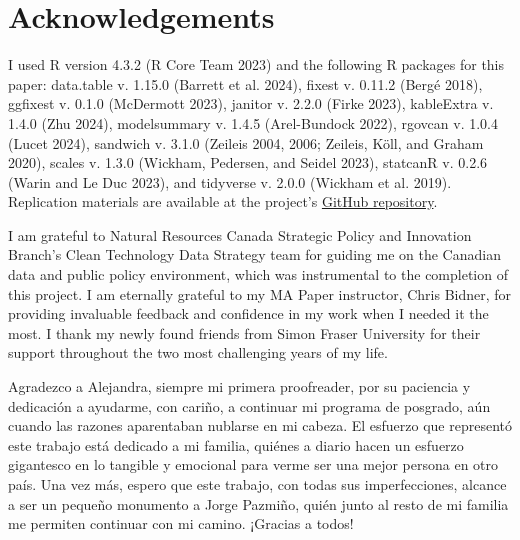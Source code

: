 \documentclass[../main.tex]{subfiles}
\begin{document}
\section{Acknowledgements}
\label{sec:acknowledgements}

I used R version 4.3.2 (R Core Team 2023) and the following R packages for this paper: data.table v. 1.15.0 (Barrett et al. 2024), fixest v. 0.11.2 (Bergé 2018), ggfixest v. 0.1.0 (McDermott 2023), janitor v. 2.2.0 (Firke 2023), kableExtra v. 1.4.0 (Zhu 2024), modelsummary v. 1.4.5 (Arel-Bundock 2022), rgovcan v. 1.0.4 (Lucet 2024), sandwich v. 3.1.0 (Zeileis 2004, 2006; Zeileis, Köll, and Graham 2020), scales v. 1.3.0 (Wickham, Pedersen, and
Seidel 2023), statcanR v. 0.2.6 (Warin and Le Duc 2023), and tidyverse v. 2.0.0 (Wickham et al. 2019). Replication materials are available at the project's \href{https://github.com/dsanchezp18/econ899}{GitHub repository}.

I am grateful to Natural Resources Canada Strategic Policy and Innovation Branch's Clean Technology Data Strategy team for guiding me on the Canadian data and public policy environment, which was instrumental to the completion of this project. I am eternally grateful to my MA Paper instructor, Chris Bidner, for providing invaluable feedback and confidence in my work when I needed it the most. I thank my newly found friends from Simon Fraser University for their support throughout the two most challenging years of my life.

Agradezco a Alejandra, siempre mi primera proofreader, por su paciencia y dedicación a ayudarme, con cariño, a continuar mi programa de posgrado, aún cuando las razones aparentaban nublarse en mi cabeza. El esfuerzo que representó este trabajo está dedicado a mi familia, quiénes a diario hacen un esfuerzo gigantesco en lo tangible y emocional para verme ser una mejor persona en otro país. Una vez más, espero que este trabajo, con todas sus imperfecciones, alcance a ser un pequeño monumento a Jorge Pazmiño, quién junto al resto de mi familia me permiten continuar con mi camino. ¡Gracias a todos! %
\end{document}
